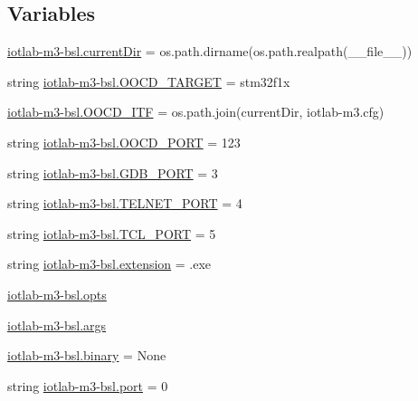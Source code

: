 \subsection*{Variables}
\begin{DoxyCompactItemize}
\item 
\hyperlink{namespaceiotlab-m3-bsl_a5703504ac10cd2df6790c60b0b4d64f1}{iotlab-\/m3-\/bsl.\+current\+Dir} = os.\+path.\+dirname(os.\+path.\+realpath(\+\_\+\+\_\+file\+\_\+\+\_\+))
\item 
string \hyperlink{namespaceiotlab-m3-bsl_a11b5e1a292d8f821269f1644702a4c6d}{iotlab-\/m3-\/bsl.\+O\+O\+C\+D\+\_\+\+T\+A\+R\+G\+ET} = \textquotesingle{}stm32f1x\textquotesingle{}
\item 
\hyperlink{namespaceiotlab-m3-bsl_a3f5093817dcb270957a3683f92607617}{iotlab-\/m3-\/bsl.\+O\+O\+C\+D\+\_\+\+I\+TF} = os.\+path.\+join(current\+Dir, \textquotesingle{}iotlab-\/m3.\+cfg\textquotesingle{})
\item 
string \hyperlink{namespaceiotlab-m3-bsl_a41113cc544e144e779f94c942f9851e8}{iotlab-\/m3-\/bsl.\+O\+O\+C\+D\+\_\+\+P\+O\+RT} = \textquotesingle{}123\textquotesingle{}
\item 
string \hyperlink{namespaceiotlab-m3-bsl_a6fdc776cc8b8835437e9cd155b6df1b1}{iotlab-\/m3-\/bsl.\+G\+D\+B\+\_\+\+P\+O\+RT} = \textquotesingle{}3\textquotesingle{}
\item 
string \hyperlink{namespaceiotlab-m3-bsl_a68381e104d1b125d86d5f6f80f393eb3}{iotlab-\/m3-\/bsl.\+T\+E\+L\+N\+E\+T\+\_\+\+P\+O\+RT} = \textquotesingle{}4\textquotesingle{}
\item 
string \hyperlink{namespaceiotlab-m3-bsl_a8b83da64b05c2868d96b8f561197fb92}{iotlab-\/m3-\/bsl.\+T\+C\+L\+\_\+\+P\+O\+RT} = \textquotesingle{}5\textquotesingle{}
\item 
string \hyperlink{namespaceiotlab-m3-bsl_a2a2b9cc3f6d5c221283fb29b56378b2e}{iotlab-\/m3-\/bsl.\+extension} = \textquotesingle{}.exe\textquotesingle{}
\item 
\hyperlink{namespaceiotlab-m3-bsl_a6c8a2e852a393282d5034a7564e13806}{iotlab-\/m3-\/bsl.\+opts}
\item 
\hyperlink{namespaceiotlab-m3-bsl_a022be7e25aaa403f637a961db725dd2b}{iotlab-\/m3-\/bsl.\+args}
\item 
\hyperlink{namespaceiotlab-m3-bsl_a0f947d61010cdb81ae6b580b0a6fac9d}{iotlab-\/m3-\/bsl.\+binary} = None
\item 
string \hyperlink{namespaceiotlab-m3-bsl_a21fae930582aa936b8c4de1f9723b0a4}{iotlab-\/m3-\/bsl.\+port} = \textquotesingle{}0\textquotesingle{}
\end{DoxyCompactItemize}
